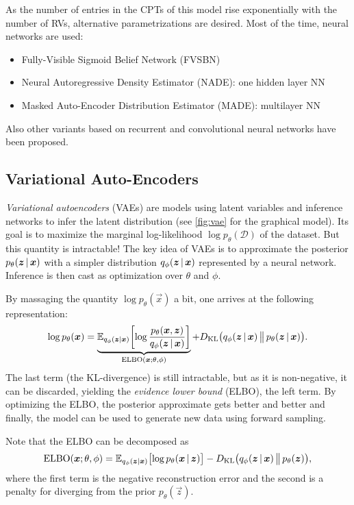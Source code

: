 			As the number of entries in the CPTs of this model rise exponentially with the number of RVs, alternative parametrizations are desired. Most of the time, neural networks are used:
			\begin{itemize}
				\item Fully-Visible Sigmoid Belief Network (FVSBN)
				\item Neural Autoregressive Density Estimator (NADE): one hidden layer NN
				\item Masked Auto-Encoder Distribution Estimator (MADE): multilayer NN
			\end{itemize}
			Also other variants based on recurrent and convolutional neural networks have been proposed.

		\subsection{Variational Auto-Encoders}
			\emph{Variational autoencoders} (VAEs) are models using latent variables and inference networks to infer the latent distribution (see \autoref{fig:vae} for the graphical model). Its goal is to maximize the marginal log-likelihood \( \log p_\theta(\mathcal{D}) \) of the dataset. But this quantity is intractable! The key idea of VAEs is to approximate the posterior \( p_\theta(\bm{z} \,\vert\, \bm{x}) \) with a simpler distribution \( q_\phi(\bm{z} \,\vert\, \bm{x}) \) represented by a neural network. Inference is then cast as optimization over \(\theta\) and \(\phi\).

			By massaging the quantity \( \log p_\theta(\vec{x}) \) a bit, one arrives at the following representation:
			\begin{equation}
				\log p_\theta(\bm{x}) = \underbrace{\mathbb{E}_{q_\phi(\bm{z} \vert \bm{x})}\biggl[ \log\frac{p_\theta(\bm{x}, \bm{z})}{q_\phi(\bm{z} \,\vert\, \bm{x})} \biggr]}_{\mathrm{ELBO}(\bm{x}; \theta, \phi)} + D_\mathrm{KL}\bigl( q_\phi(\bm{z} \,\vert\, \bm{x}) \,\big\Vert\, p_\theta(\bm{z} \,\vert\, \bm{x}) \bigr).
			\end{equation}
			The last term (the KL-divergence) is still intractable, but as it is non-negative, it can be discarded, yielding the \emph{evidence lower bound} (ELBO), the left term. By optimizing the ELBO, the posterior approximate gets better and better and finally, the model can be used to generate new data using forward sampling.

			Note that the ELBO can be decomposed as
			\begin{equation}
				\mathrm{ELBO}(\bm{x}; \theta, \phi) = \mathbb{E}_{q_\phi(\bm{z} \vert \bm{x})}\bigl[ \log p_\theta(\bm{x} \,\vert\, \bm{z}) \bigr] - D_\mathrm{KL}\bigl( q_\phi(\bm{z} \,\vert\, \bm{x}) \,\big\Vert\, p_\theta(\bm{z}) \bigr),
			\end{equation}
			where the first term is the negative reconstruction error and the second is a penalty for diverging from the prior \( p_\theta(\vec{z}) \).


